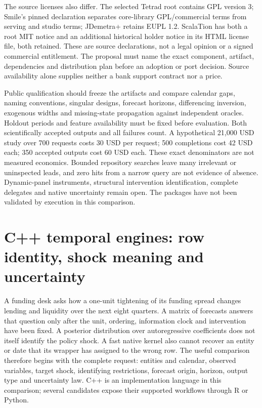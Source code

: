 The source licenses also differ. The selected Tetrad root contains GPL version 3; Smile's pinned declaration separates core-library GPL/commercial terms from serving and studio terms; JDemetra+ retains EUPL 1.2. ScalaTion has both a root MIT notice and an additional historical holder notice in its HTML license file, both retained. These are source declarations, not a legal opinion or a signed commercial entitlement. The proposal must name the exact component, artifact, dependencies and distribution plan before an adoption or port decision. Source availability alone supplies neither a bank support contract nor a price.~\citep{exec25_jdyn_tetrad,exec25_jdyn_smile,exec25_jdyn_scalation,exec25_jdyn_jdplus}

Public qualification should freeze the artifacts and compare calendar gaps, naming conventions, singular designs, forecast horizons, differencing inversion, exogenous widths and missing-state propagation against independent oracles. Holdout periods and feature availability must be fixed before evaluation. Both scientifically accepted outputs and all failures count. A hypothetical 21,000 USD study over 700 requests costs 30 USD per request; 500 completions cost 42 USD each; 350 accepted outputs cost 60 USD each. These exact denominators are not measured economics. Bounded repository searches leave many irrelevant or uninspected leads, and zero hits from a narrow query are not evidence of absence. Dynamic-panel instruments, structural intervention identification, complete delegates and native uncertainty remain open. The packages have not been validated by execution in this comparison.~\citep{exec25_jdyn_choice}


\section{C++ temporal engines: row identity, shock meaning and uncertainty}
\label{sec:exec25-cxx-dynamic}

A funding desk asks how a one-unit tightening of its funding spread changes lending and liquidity over the next eight quarters. A matrix of forecasts answers that question only after the unit, ordering, information clock and intervention have been fixed. A posterior distribution over autoregressive coefficients does not itself identify the policy shock. A fast native kernel also cannot recover an entity or date that its wrapper has assigned to the wrong row. The useful comparison therefore begins with the complete request: entities and calendar, observed variables, target shock, identifying restrictions, forecast origin, horizon, output type and uncertainty law. C++ is an implementation language in this comparison; several candidates expose their supported workflows through R or Python.

